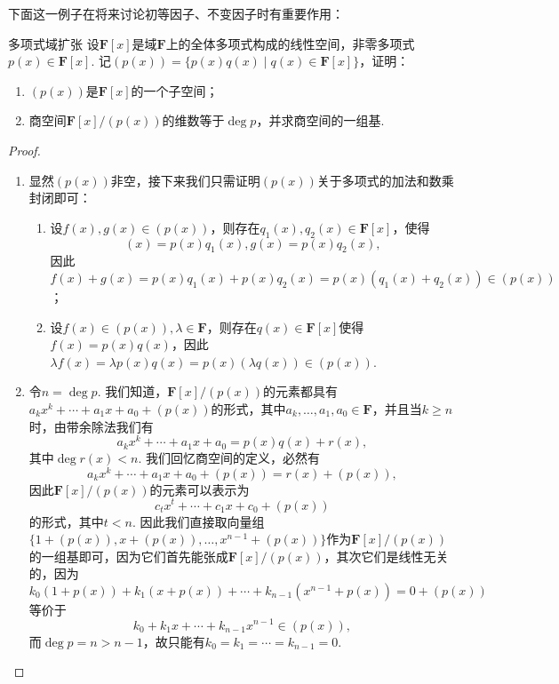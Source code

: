 下面这一例子在将来讨论初等因子、不变因子时有重要作用：
\begin{example}{}{多项式域扩张}
    设$\mathbf{F}[x]$是域$\mathbf{F}$上的全体多项式构成的线性空间，非零多项式$p(x)\in \mathbf{F}[x]$. 记$(p(x))=\{p(x)q(x)\mid q(x)\in \mathbf{F}[x]\}$，证明：
    \begin{enumerate}
        \item $(p(x))$是$\mathbf{F}[x]$的一个子空间；
        \item 商空间$\mathbf{F}[x]/(p(x))$的维数等于$\deg p$，并求商空间的一组基.
    \end{enumerate}
\end{example}
\begin{proof}
    \begin{enumerate}
        \item 显然$(p(x))$非空，接下来我们只需证明$(p(x))$关于多项式的加法和数乘封闭即可：
              \begin{enumerate}
                  \item 设$f(x),g(x)\in(p(x))$，则存在$q_1(x),q_2(x)\in\mathbf{F}[x]$，使得
                        \[(x)=p(x)q_1(x),g(x)=p(x)q_2(x),\]
                        因此$f(x)+g(x)=p(x)q_1(x)+p(x)q_2(x)=p(x)(q_1(x)+q_2(x))\in(p(x))$；
                  \item 设$f(x)\in(p(x)),\lambda\in\mathbf{F}$，则存在$q(x)\in\mathbf{F}[x]$使得$f(x)=p(x)q(x)$，因此$\lambda f(x)=\lambda p(x)q(x)=p(x)(\lambda q(x))\in(p(x))$.
              \end{enumerate}
        \item 令$n=\deg p$. 我们知道，$\mathbf{F}[x]/(p(x))$的元素都具有$a_kx^k+\cdots+a_1x+a_0+(p(x))$的形式，其中$a_k,\ldots,a_1,a_0\in\mathbf{F}$，并且当$k\geqslant n$时，由带余除法我们有
              \[a_kx^k+\cdots+a_1x+a_0=p(x)q(x)+r(x),\]
              其中$\deg r(x)<n$. 我们回忆商空间的定义，必然有
              \[a_kx^k+\cdots+a_1x+a_0+(p(x))=r(x)+(p(x)),\]
              因此$\mathbf{F}[x]/(p(x))$的元素可以表示为
              \[c_tx^t+\cdots+c_1x+c_0+(p(x))\]
              的形式，其中$t<n$. 因此我们直接取向量组$\{1+(p(x)),x+(p(x)),\ldots,x^{n-1}+(p(x))\}$作为$\mathbf{F}[x]/(p(x))$的一组基即可，因为它们首先能张成$\mathbf{F}[x]/(p(x))$，其次它们是线性无关的，因为
              \[k_0(1+p(x))+k_1(x+p(x))+\cdots+k_{n-1}(x^{n-1}+p(x))=0+(p(x))\]
              等价于
              \[k_0+k_1x+\cdots+k_{n-1}x^{n-1}\in(p(x)),\]
              而$\deg p=n>n-1$，故只能有$k_0=k_1=\cdots=k_{n-1}=0$.
    \end{enumerate}
\end{proof}

